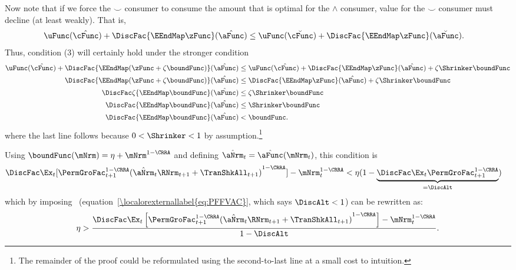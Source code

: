 \documentclass[\econtexRoot/BufferStockTheory]{subfiles}
\begin{document}
Now note that if we force the $\smile$ consumer to consume the amount that is
optimal for the $\wedge$ consumer, value for the $\smile$ consumer must decline (at least weakly).  That is,
\begin{align*}
\uFunc(\hat{\cFunc})+\DiscFac \{\EEndMap \zFunc \}(\hat{\aFunc})  & \leq \uFunc(\breve{\cFunc})+\DiscFac \{\EEndMap \zFunc \}(\breve{\aFunc})
.
\end{align*}
Thus, condition (3) will certainly hold under the stronger condition
\begin{align*}
\uFunc(\hat{\cFunc})+\DiscFac\{\EEndMap (\zFunc+\zeta \boundFunc) \}(\hat{\aFunc})  & \leq  \uFunc(\hat{\cFunc})+\DiscFac\{\EEndMap \zFunc \}(\hat{\aFunc})  + \zeta \Shrinker \boundFunc
\\ \DiscFac\{\EEndMap (\zFunc+\zeta \boundFunc) \}(\hat{\aFunc})  & \leq  \DiscFac\{\EEndMap \zFunc  \}(\hat{\aFunc})  + \zeta \Shrinker \boundFunc
\\ \DiscFac\zeta \{\EEndMap \boundFunc \}(\hat{\aFunc})  & \leq  \zeta \Shrinker \boundFunc
\\ \DiscFac\{\EEndMap \boundFunc \}(\hat{\aFunc})  & \leq  \Shrinker \boundFunc
\\ \DiscFac\{\EEndMap \boundFunc \}(\hat{\aFunc})   & < \boundFunc %
.
\end{align*}
where the last line follows because $0 < \Shrinker < 1$ by assumption.\footnote{The remainder of the proof could be reformulated using the second-to-last line at a small cost to intuition.}

Using $\boundFunc(\mNrm)= \eta + \mNrm^{1-\CRRA}$
and defining $\hat{\aNrm}_{t}=\hat{\aFunc}(\mNrm_{t})$, this condition is
\begin{align*}
\DiscFac \Ex_{t}[{\PermGroFac}_{t+1}^{1-\CRRA}{(\hat{\aNrm}_{t}\RNrm_{t+1}+\TranShkAll_{t+1})}^{1-\CRRA}]-\mNrm_{t}^{1-\CRRA}  & < \eta(1-\underbrace{\DiscFac\Ex_{t}{\PermGroFac}_{t+1}^{1-\CRRA}}_{=\DiscAlt})
\end{align*}
which by imposing \PFFVAC~(equation~\eqref{\localorexternallabel{eq:PFFVAC}}, which says $\DiscAlt<1$) can be rewritten as:
\begin{equation}\begin{gathered}\begin{aligned}
 \eta>\frac{\DiscFac \Ex_{t}\left[{\PermGroFac}_{t+1}^{1-\CRRA}{(\hat{\aNrm}_{t}\RNrm_{t+1}+\TranShkAll_{t+1})}^{1-\CRRA}\right]-\mNrm_{t}^{1-\CRRA}}{1-\DiscAlt}\label{eq:KeyCondition}.
\end{aligned}\end{gathered}\end{equation}
\end{document}
